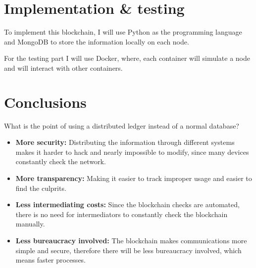\documentclass[twocolumn]{article} %
\begin{document}
\section{Implementation \& testing}
To implement this blockchain, I will use Python as the programming language and MongoDB to store the information locally on each node.\newline

\noindent For the testing part I will use Docker, where, each container will simulate a node and will interact with other containers.
\section{Conclusions}
What is the point of using a distributed ledger instead of a normal database?

\begin{itemize}
    \item \textbf{More security:} Distributing the information through different systems makes it harder to hack and nearly impossible to modify, since many devices constantly check the network.
    \item \textbf{More transparency:} Making it easier to track improper usage and easier to find the culprits.
    \item \textbf{Less intermediating costs:} Since the blockchain checks are automated, there is no need for intermediators to constantly check the blockchain manually.
    \item \textbf{Less bureaucracy involved:} The blockchain makes communications more simple and secure, therefore there will be less bureaucracy involved, which means faster processes. 
\end{itemize}
\end{document}
